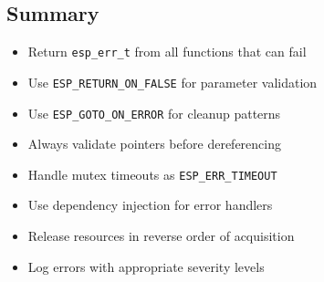 \subsection{Summary}

\begin{itemize}
    \item Return \texttt{esp\_err\_t} from all functions that can fail
    \item Use \texttt{ESP\_RETURN\_ON\_FALSE} for parameter validation
    \item Use \texttt{ESP\_GOTO\_ON\_ERROR} for cleanup patterns
    \item Always validate pointers before dereferencing
    \item Handle mutex timeouts as \texttt{ESP\_ERR\_TIMEOUT}
    \item Use dependency injection for error handlers
    \item Release resources in reverse order of acquisition
    \item Log errors with appropriate severity levels
\end{itemize}


